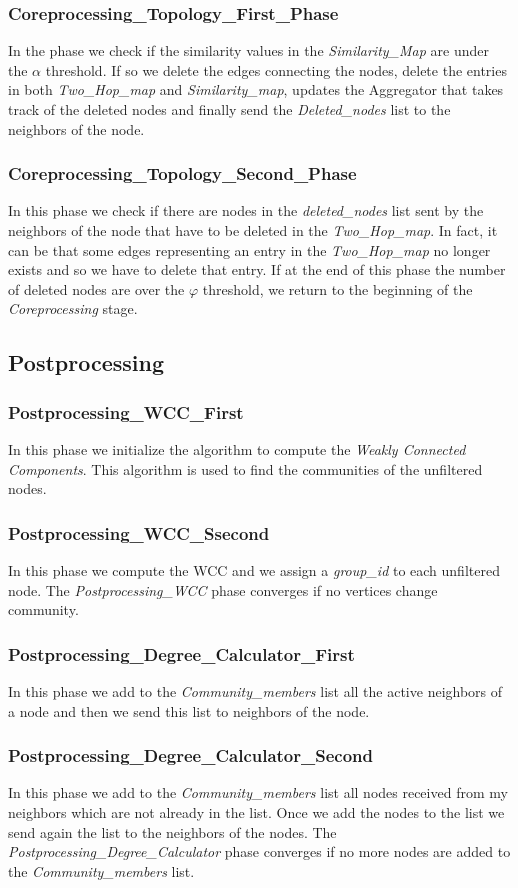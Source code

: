 \documentclass[12pt]{article}
\begin{document}
\subsubsection{Coreprocessing\_Topology\_First\_Phase}
In the phase we check if the similarity values in the \emph{Similarity\_Map} are under the $\alpha$ threshold. If so we delete the edges connecting the nodes, delete the entries in both \emph{Two\_Hop\_map} and \emph{Similarity\_map}, updates the Aggregator that takes track of the deleted nodes and finally send the \emph{Deleted\_nodes} list to the neighbors of the node.
\subsubsection{Coreprocessing\_Topology\_Second\_Phase}
In this phase we check if there are nodes in the \emph{deleted\_nodes} list sent by the neighbors of the node that have to be deleted in the \emph{Two\_Hop\_map}. In fact, it can be that some edges representing an entry in the \emph{Two\_Hop\_map} no longer exists and so we have to delete that entry. If at the end of this phase the number of deleted nodes are over the $\varphi$ threshold, we return to the beginning of the \emph{Coreprocessing} stage.
\subsection{Postprocessing}
\subsubsection{Postprocessing\_WCC\_First}
In this phase we initialize the algorithm to compute the \emph{Weakly Connected Components}. This algorithm is used to find the communities of the unfiltered nodes.
\subsubsection{Postprocessing\_WCC\_Ssecond}
In this phase we compute the WCC and we assign a \emph{group\_id} to each unfiltered node. The \emph{Postprocessing\_WCC} phase converges if no vertices change community.
\subsubsection{Postprocessing\_Degree\_Calculator\_First}
In this phase we add to the \emph{Community\_members} list all the active neighbors of a node and then we send this list to neighbors of the node.
\subsubsection{Postprocessing\_Degree\_Calculator\_Second}
In this phase we add to the \emph{Community\_members} list all nodes received from my neighbors which are not already in the list. Once we add the nodes to the list we send again the list to the neighbors of the nodes. The \emph{Postprocessing\_Degree\_Calculator} phase converges if no more nodes are added to the \emph{Community\_members} list.
\end{document}
